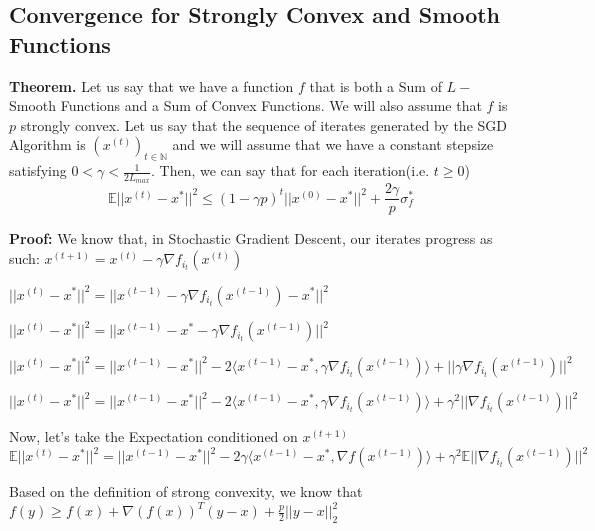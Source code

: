 \subsection{Convergence for Strongly Convex and Smooth Functions}
\noindent \textbf{Theorem.} Let us say that we have a function $f$ that is both a Sum of $L-$Smooth Functions and a Sum of Convex Functions. We will also assume that $f$ is $p$ strongly convex. Let us say that the sequence of iterates generated by the SGD Algorithm is $(x^{(t)})_{t \in \mathbb{N}}$ and we will assume that we have a constant stepsize satisfying $0 < \gamma < \frac{1}{2L_{max}}$. Then, we can say that for each iteration(i.e. $t \geq 0$) 
\begin{equation}
    \mathbb{E}||x^{(t)} - x^*||^2 \leq (1 - \gamma p)^t ||x^{(0)} - x^*||^2 + \frac{2 \gamma}{p} \sigma_f^*
\end{equation}

\noindent \textbf{Proof:} \newline 
We know that, in Stochastic Gradient Descent, our iterates progress as such: $x^{(t + 1)}  = x^{(t)} - \gamma \nabla f_{i_t}(x^{(t)})$ \newline 

$||x^{(t)} - x^*||^2 = ||x^{(t - 1)} - \gamma \nabla f_{i_t}(x^{(t - 1)}) - x^*||^2$ \newline 

$||x^{(t)} - x^*||^2 = ||x^{(t - 1)} - x^* - \gamma \nabla f_{i_t}(x^{(t - 1)})||^2$ \newline 


$||x^{(t)} - x^*||^2 = ||x^{(t - 1)} - x^*||^2 - 2\langle x^{(t - 1)} - x^*,  \gamma \nabla f_{i_t}(x^{(t - 1)})\rangle + ||\gamma \nabla f_{i_t}(x^{(t - 1)})||^2$

$||x^{(t)} - x^*||^2 = ||x^{(t - 1)} - x^*||^2 - 2\langle x^{(t - 1)} - x^*,  \gamma \nabla f_{i_t}(x^{(t - 1)})\rangle + \gamma^2 ||\nabla f_{i_t}(x^{(t - 1)})||^2$

Now, let's take the Expectation conditioned on $x^{(t + 1)}$ \newline 
$\mathbb{E}||x^{(t)} - x^*||^2 = ||x^{(t - 1)} - x^*||^2 - 2\gamma \langle x^{(t - 1)} - x^*,  \nabla f(x^{(t - 1)})\rangle + \gamma^2 \mathbb{E} ||\nabla f_{i_t}(x^{(t - 1)})||^2$ \newline 


Based on the definition of strong convexity, we know that $f(y) \geq f(x) + \nabla(f(x))^T (y - x) + \frac{p}{2} ||y - x||^2_2$ \newline 


